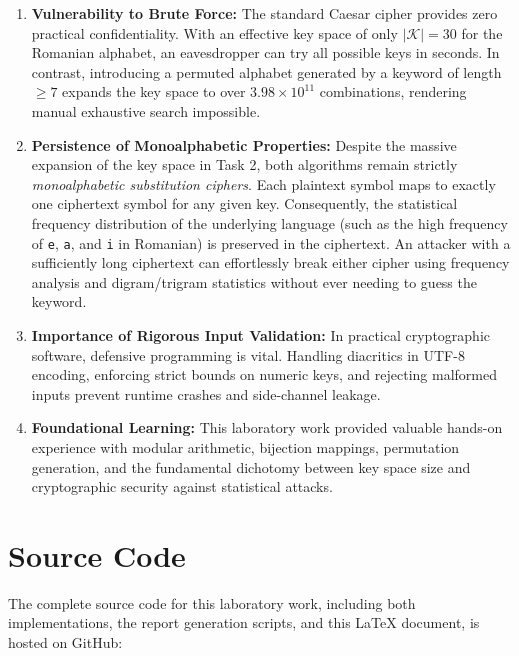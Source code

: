 \documentclass{labreport}
\begin{document}
\begin{enumerate}
    \item \textbf{Vulnerability to Brute Force:} The standard Caesar cipher provides zero practical confidentiality. With an effective key space of only $|\mathcal{K}| = 30$ for the Romanian alphabet, an eavesdropper can try all possible keys in seconds. In contrast, introducing a permuted alphabet generated by a keyword of length $\ge 7$ expands the key space to over $3.98 \times 10^{11}$ combinations, rendering manual exhaustive search impossible.
    
    \item \textbf{Persistence of Monoalphabetic Properties:} Despite the massive expansion of the key space in Task 2, both algorithms remain strictly \textit{monoalphabetic substitution ciphers}. Each plaintext symbol maps to exactly one ciphertext symbol for any given key. Consequently, the statistical frequency distribution of the underlying language (such as the high frequency of \texttt{e}, \texttt{a}, and \texttt{i} in Romanian) is preserved in the ciphertext. An attacker with a sufficiently long ciphertext can effortlessly break either cipher using frequency analysis and digram/trigram statistics without ever needing to guess the keyword.
    
    \item \textbf{Importance of Rigorous Input Validation:} In practical cryptographic software, defensive programming is vital. Handling diacritics in UTF-8 encoding, enforcing strict bounds on numeric keys, and rejecting malformed inputs prevent runtime crashes and side-channel leakage.
    
    \item \textbf{Foundational Learning:} This laboratory work provided valuable hands-on experience with modular arithmetic, bijection mappings, permutation generation, and the fundamental dichotomy between key space size and cryptographic security against statistical attacks.
\end{enumerate}

\section{Source Code}

The complete source code for this laboratory work, including both implementations, the report generation scripts, and this \LaTeX{} document, is hosted on GitHub:
\end{document}
